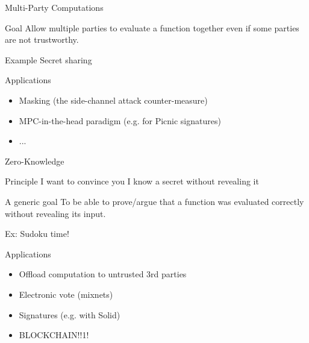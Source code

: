 \documentclass[presentation,aspectratio=1610]{beamer}
\begin{document}
\begin{frame}{Multi-Party Computations}
  \begin{exampleblock}{Goal}
    Allow multiple parties to evaluate a function together even if some parties are not trustworthy.
  \end{exampleblock}

  \pause
  
  \begin{alertblock}{Example}
    Secret sharing
  \end{alertblock}

  \pause

  \begin{block}{Applications}
    \begin{itemize}
    \item Masking (the side-channel attack counter-measure)
    \item MPC-in-the-head paradigm (e.g. for Picnic signatures)
    \item ...
    \end{itemize}
  \end{block}
\end{frame}




\begin{frame}{Zero-Knowledge}
  \begin{exampleblock}{Principle}
    I want to convince you I know a secret \alert{without revealing it}
  \end{exampleblock}

  \pause
  \begin{block}{A generic goal}
    To be able to prove/argue that a function was evaluated correctly
    without revealing its input.

    \pause

    Ex: Sudoku time!
  \end{block}


  \pause
  
  \begin{block}{Applications}
    \begin{itemize}
    \item Offload computation to untrusted 3rd parties
    \item Electronic vote (mixnets)
    \item Signatures (e.g. with Solid)
      \pause
    \item BLOCKCHAIN!!1!
    \end{itemize}
  \end{block}
\end{frame}
\end{document}
